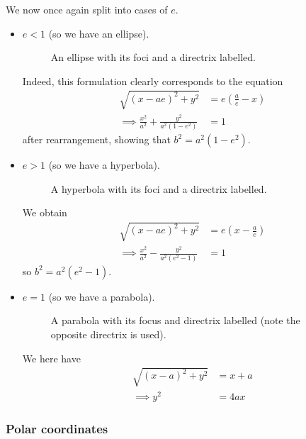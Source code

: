 \documentclass{../../template/note}
\begin{document}
    We now once again split into cases of \(e\).

    \begin{itemize}
        \item \(e < 1\) (so we have an ellipse).
        \begin{figure}[ht]
            \centering
            \caption{An ellipse with its foci and a directrix labelled.}
            \label{fig:focus-directrix-ellipse}
        \end{figure}
        Indeed, this formulation clearly corresponds to the equation
        \begin{align*}
            \sqrt{(x-ae)^2+y^2}&=e\left(\frac a e - x\right) \\
            \implies\frac{x^2}{a^2} + \frac{y^2}{a^2(1-e^2)} &= 1
        \end{align*}
        after rearrangement, showing that \(b^2 = a^2(1-e^2)\).
        \item \(e > 1\) (so we have a hyperbola).
        \begin{figure}[H]
            \centering
            \caption{A hyperbola with its foci and a directrix labelled.}
            \label{fig:focus-directrix-hyperbola}
        \end{figure}
        We obtain
        \begin{align*}
            \sqrt{(x-ae)^2+y^2} &= e\left(x-\frac a e\right) \\
            \implies\frac{x^2}{a^2} - \frac{y^2}{a^2(e^2-1)} &= 1
        \end{align*}
        so \(b^2 = a^2(e^2-1)\).
        \item \(e = 1\) (so we have a parabola).
        \begin{figure}[ht]
            \centering
            \caption{A parabola with its focus and directrix labelled (note the opposite directrix is used).}
            \label{fig:focus-directrix-parabola}
        \end{figure}
        We here have
        \begin{align*}
            \sqrt{(x-a)^2+y^2} &= x+a \\
            \implies y^2 &= 4ax
        \end{align*}
    \end{itemize}

    \subsubsection{Polar coordinates}
    
\end{document}

